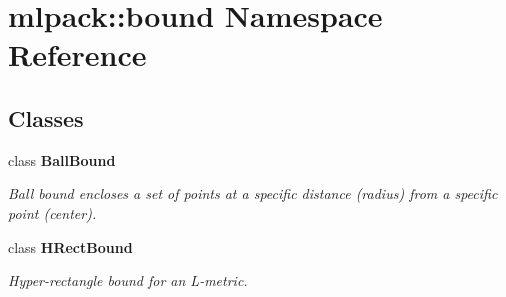 \section{mlpack\-:\-:bound Namespace Reference}
\label{namespacemlpack_1_1bound}
\subsection*{Classes}
\begin{DoxyCompactItemize}
\item 
class {\bf Ball\-Bound}
\begin{DoxyCompactList}\small\item\em Ball bound encloses a set of points at a specific distance (radius) from a specific point (center). \end{DoxyCompactList}\item 
class {\bf H\-Rect\-Bound}
\begin{DoxyCompactList}\small\item\em Hyper-\/rectangle bound for an L-\/metric. \end{DoxyCompactList}\end{DoxyCompactItemize}
